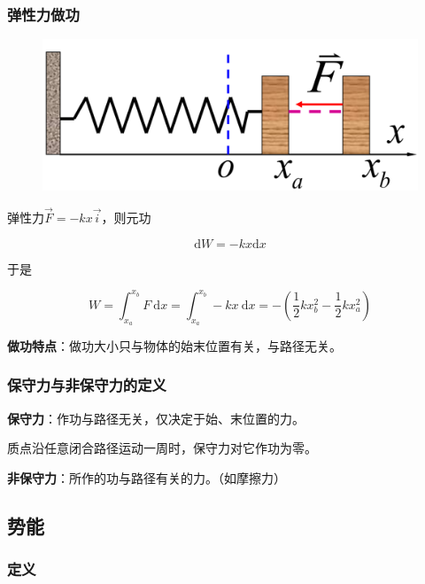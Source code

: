 \documentclass[
	12pt, %
	a4paper, %
]{myLegrandOrangeBook}
\newcommand{\rmd}{\mathrm{d}}
\begin{document}
\subsubsection*{弹性力做功}

\begin{figure}
    \centering
    \includegraphics[scale=0.12]{"Chapter 03 images/pic5.png"}
    \label{pic5}
\end{figure}

弹性力\(\overrightarrow{F} = -kx\overrightarrow{i}\)，则元功

\[
    \rmd W = -kx \rmd x
\]

于是

\begin{equation}
    W=\int_{x_a}^{x_b} F \mathrm{~d} x=\int_{x_a}^{x_b}-k x \mathrm{~d} x=-\left(\frac{1}{2} k x_b^2-\frac{1}{2} k x_a^2\right)
\end{equation}

\textbf{做功特点}：做功大小只与物体的始末位置有关，与路径无关。

\subsubsection*{保守力与非保守力的定义}

\textbf{保守力}：作功与路径无关，仅决定于始、末位置的力。

质点沿任意闭合路径运动一周时，保守力对它作功为零。

\textbf{非保守力}：所作的功与路径有关的力。（如摩擦力）

\subsection{势能}

\subsubsection*{定义}
\end{document}
